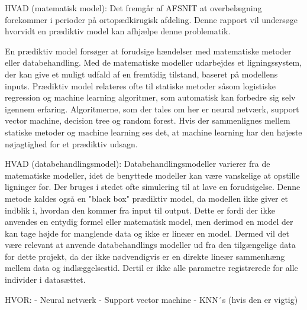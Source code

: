 %
HVAD (matematisk model):
Det fremgår af AFSNIT at overbelægning forekommer i perioder på ortopædkirugisk afdeling. Denne rapport vil undersøge hvorvidt en prædiktiv model kan afhjælpe denne problematik. 

En prædiktiv model forsøger at forudsige hændelser med matematiske metoder eller databehandling. Med de matematiske modeller udarbejdes et ligningssystem, der kan give et muligt udfald af en fremtidig tilstand, baseret på modellens inputs. Prædiktiv model relateres ofte til statiske metoder såsom logistiske regression og machine learning algoritmer, som automatisk kan forbedre sig selv igennem erfaring. Algoritmerne, som der tales om her er neural netværk, support vector machine, decision tree og random forest. Hvis der sammenlignes mellem statiske metoder og machine learning ses det, at machine learning har den højeste nøjagtighed for et prædiktiv udsagn. \cite{Luo2016} 





HVAD (databehandlingsmodel):
Databehandlingsmodeller varierer fra de matematiske modeller, idet de benyttede modeller kan være vanskelige at opstille ligninger for. Der bruges i stedet ofte simulering til at lave en forudsigelse. Denne metode kaldes også en "black box" prædiktiv model, da modellen ikke giver et indblik i, hvordan den kommer fra input til output. Dette er fordi der ikke anvendes en entydig formel eller matematisk model, men derimod en model der kan tage højde for manglende data og ikke er lineær en model. Dermed vil det være relevant at anvende databehandlings modeller ud fra den tilgængelige data for dette projekt, da der ikke nødvendigvis er en direkte lineær sammenhæng mellem data og indlæggelsestid. Dertil er ikke alle parametre registrerede for alle individer i datasættet.\cite{Kuhn2013}

HVOR: 
- Neural netværk
- Support vector machine 
- KNN´s (hvis den er vigtig)

